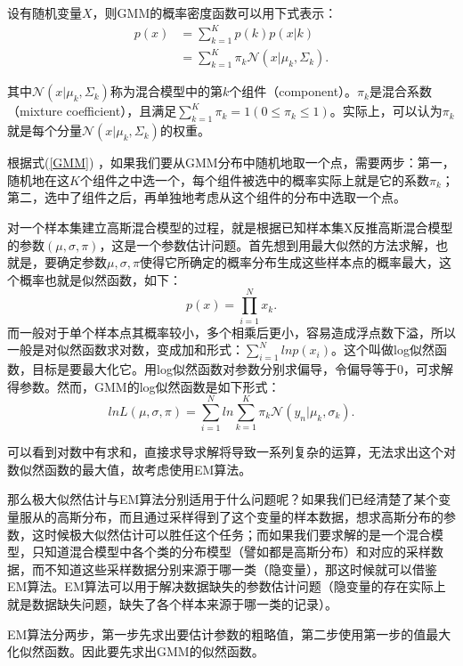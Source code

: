 \documentclass[UTF8]{ctexart}
\begin{document}
设有随机变量$X$，则GMM的概率密度函数可以用下式表示：
\begin{equation}\label{GMM}
  \begin{split}
    p(x) &= \sum_{k=1}^{K}p(k)p(x|k)\\
	&= \sum_{k=1}^{K}\pi_k\mathcal{N}(x|\mu_k, \Sigma_k).
  \end{split}
\end{equation}

其中$\mathcal{N}(x|\mu_k, \Sigma_k)$称为混合模型中的第$k$个组件（component）。$\pi_k$是混合系数（mixture coefficient），且满足$\sum_{k=1}^K\pi_k = 1(0\le\pi_k\le1)$。实际上，可以认为$\pi_k$就是每个分量$\mathcal{N}(x|\mu_k, \Sigma_k)$的权重。

根据式(\ref{GMM}) ，如果我们要从GMM分布中随机地取一个点，需要两步：第一，随机地在这$K$个组件之中选一个，每个组件被选中的概率实际上就是它的系数$\pi_k$；第二，选中了组件之后，再单独地考虑从这个组件的分布中选取一个点。

对一个样本集建立高斯混合模型的过程，就是根据已知样本集X反推高斯混合模型的参数$(\mu,\sigma,\pi)$，这是一个参数估计问题。首先想到用最大似然的方法求解，也就是，要确定参数$\mu,\sigma,\pi$使得它所确定的概率分布生成这些样本点的概率最大，这个概率也就是似然函数，如下：
\begin{equation}
  p(x) = \prod_{i=1}^{N}x_k.
\end{equation}
而一般对于单个样本点其概率较小，多个相乘后更小，容易造成浮点数下溢，所以一般是对似然函数求对数，变成加和形式：$\sum_{i=1}^{N}lnp(x_i)$。这个叫做log似然函数，目标是要最大化它。用log似然函数对参数分别求偏导，令偏导等于0，可求解得参数。然而，GMM的log似然函数是如下形式：
\begin{equation}
  lnL(\mu,\sigma,\pi) = \sum_{i=1}^{N}ln\sum_{k=1}^{K}\pi_k\mathcal{N}(y_n|\mu_k,\sigma_k).
\end{equation}

可以看到对数中有求和，直接求导求解将导致一系列复杂的运算，无法求出这个对数似然函数的最大值，故考虑使用EM算法。

那么极大似然估计与EM算法分别适用于什么问题呢？如果我们已经清楚了某个变量服从的高斯分布，而且通过采样得到了这个变量的样本数据，想求高斯分布的参数，这时候极大似然估计可以胜任这个任务；而如果我们要求解的是一个混合模型，只知道混合模型中各个类的分布模型（譬如都是高斯分布）和对应的采样数据，而不知道这些采样数据分别来源于哪一类（隐变量），那这时候就可以借鉴EM算法。EM算法可以用于解决数据缺失的参数估计问题（隐变量的存在实际上就是数据缺失问题，缺失了各个样本来源于哪一类的记录）。

EM算法分两步，第一步先求出要估计参数的粗略值，第二步使用第一步的值最大化似然函数。因此要先求出GMM的似然函数。
\end{document}
